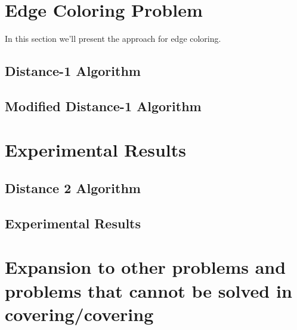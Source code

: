 \documentclass[twoside]{article}
\begin{document}
\section{Edge Coloring Problem}

In this section we'll present the approach for edge coloring.

\subsection{Distance-1 Algorithm}

\subsection{Modified Distance-1 Algorithm}


\section{Experimental Results}


\subsection{Distance 2 Algorithm}
\subsection{Experimental Results}

\section{Expansion to other problems and problems that cannot be solved in covering/covering}



\end{document}
